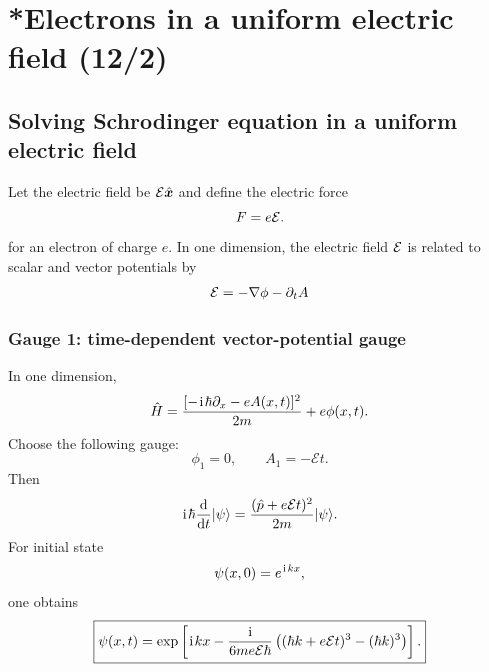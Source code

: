 \section{*Electrons in a uniform electric field (12/2)}


\subsection{Solving Schrodinger equation in a uniform electric field}

Let the electric field be $\mathcal{E}\hat{\bm x}$ and define the electric force
\begin{equation}
 F=e\mathcal{E}.
\end{equation}
for an electron of charge $e$. In one dimension, the electric field $\mathcal{E}$ is related to scalar and vector potentials by
\begin{align}
    \mathcal{E}=-\nabla\phi-\partial_t A
\end{align}

\subsubsection{Gauge 1: time-dependent vector-potential gauge}
In one dimension,
\begin{equation}
\hat H=\frac{[-\hspace{1pt}\mathrm{i}\hspace{1pt}\hbar\partial_x-eA(x,t)]^2}{2m}+e\phi(x,t).
\end{equation}
Choose the following gauge:
\begin{equation}
\phi_1=0,
\qquad
A_1=-\mathcal Et.
\end{equation}
Then
\begin{equation}
\hspace{1pt}\mathrm{i}\hspace{1pt}\hbar\frac{\mathrm{d}}{\mathrm{d} t}|{\psi}\rangle
=\frac{(\hat p+e\mathcal Et)^2}{2m}|{\psi}\rangle.
\end{equation}
For initial state
\begin{equation}
\psi(x,0)=e^{\hspace{1pt}\mathrm{i}\hspace{1pt} kx},
\end{equation}
one obtains
\begin{equation}
\boxed{
\psi(x,t)=
\exp\left[
\hspace{1pt}\mathrm{i}\hspace{1pt} kx-\frac{\hspace{1pt}\mathrm{i}\hspace{1pt}}{6me\mathcal E\hbar}
\left((\hbar k+e\mathcal Et)^3-(\hbar k)^3\right)
\right].}
\end{equation}

